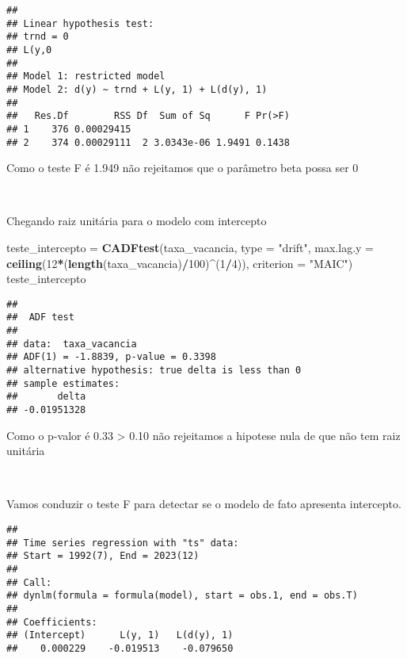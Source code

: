 \documentclass[
]{article}
\newenvironment{Shaded}{\begin{snugshade}}{\end{snugshade}}
\newcommand{\AttributeTok}[1]{\textcolor[rgb]{0.13,0.29,0.53}{#1}}
\newcommand{\DecValTok}[1]{\textcolor[rgb]{0.00,0.00,0.81}{#1}}
\newcommand{\FunctionTok}[1]{\textcolor[rgb]{0.13,0.29,0.53}{\textbf{#1}}}
\newcommand{\NormalTok}[1]{#1}
\newcommand{\OtherTok}[1]{\textcolor[rgb]{0.56,0.35,0.01}{#1}}
\newcommand{\SpecialCharTok}[1]{\textcolor[rgb]{0.81,0.36,0.00}{\textbf{#1}}}
\newcommand{\StringTok}[1]{\textcolor[rgb]{0.31,0.60,0.02}{#1}}
\begin{document}
\begin{verbatim}
## 
## Linear hypothesis test:
## trnd = 0
## L(y,0
## 
## Model 1: restricted model
## Model 2: d(y) ~ trnd + L(y, 1) + L(d(y), 1)
## 
##   Res.Df        RSS Df  Sum of Sq      F Pr(>F)
## 1    376 0.00029415                            
## 2    374 0.00029111  2 3.0343e-06 1.9491 0.1438
\end{verbatim}

Como o teste F é 1.949 não rejeitamos que o parâmetro beta possa ser 0

~

Chegando raiz unitária para o modelo com intercepto

\begin{Shaded}
\begin{Highlighting}[]
\NormalTok{teste\_intercepto }\OtherTok{=} \FunctionTok{CADFtest}\NormalTok{(taxa\_vacancia, }\AttributeTok{type =} \StringTok{"drift"}\NormalTok{, }\AttributeTok{max.lag.y =} \FunctionTok{ceiling}\NormalTok{(}\DecValTok{12}\SpecialCharTok{*}\NormalTok{(}\FunctionTok{length}\NormalTok{(taxa\_vacancia)}\SpecialCharTok{/}\DecValTok{100}\NormalTok{)}\SpecialCharTok{\^{}}\NormalTok{(}\DecValTok{1}\SpecialCharTok{/}\DecValTok{4}\NormalTok{)), }
                 \AttributeTok{criterion =} \StringTok{"MAIC"}\NormalTok{)}
\NormalTok{teste\_intercepto}
\end{Highlighting}
\end{Shaded}

\begin{verbatim}
## 
##  ADF test
## 
## data:  taxa_vacancia
## ADF(1) = -1.8839, p-value = 0.3398
## alternative hypothesis: true delta is less than 0
## sample estimates:
##       delta 
## -0.01951328
\end{verbatim}

Como o p-valor é 0.33 \textgreater{} 0.10 não rejeitamos a hipotese nula
de que não tem raiz unitária

~

Vamos conduzir o teste F para detectar se o modelo de fato apresenta
intercepto.

\begin{Shaded}
\end{Shaded}

\begin{verbatim}
## 
## Time series regression with "ts" data:
## Start = 1992(7), End = 2023(12)
## 
## Call:
## dynlm(formula = formula(model), start = obs.1, end = obs.T)
## 
## Coefficients:
## (Intercept)      L(y, 1)   L(d(y), 1)  
##    0.000229    -0.019513    -0.079650
\end{verbatim}
\end{document}
